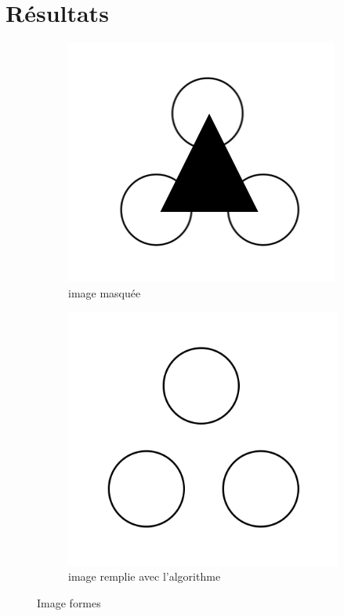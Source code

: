 \documentclass[9pt]{extarticle}
\begin{document}
\section{Résultats}
\begin{figure}[h]
    \centering
    \begin{subfigure}{0.4\textwidth}
        \centering
        \includegraphics[width=\textwidth]{images/triangle.png}
        \caption{image masquée}
    \end{subfigure}
    \hfill
    \begin{subfigure}{0.4\textwidth}
        \centering
        \includegraphics[width=\textwidth]{images/triangle_inpaint.png}
        \caption{image remplie avec l'algorithme}
    \end{subfigure}
    \caption{Image formes}
\end{figure}
\end{document}
